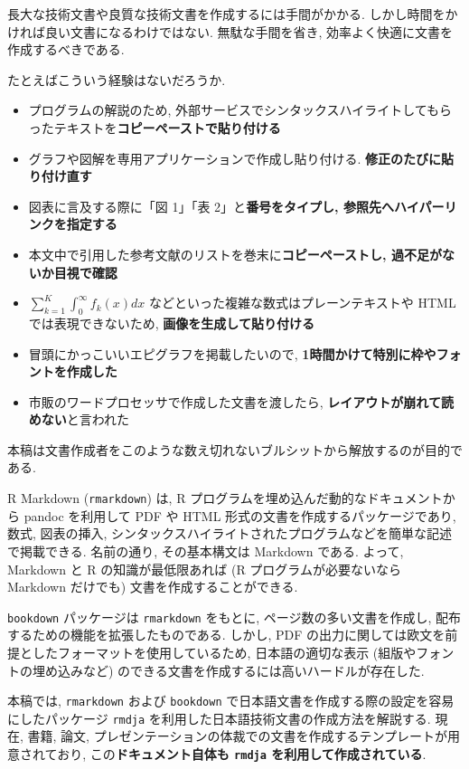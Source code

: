 \documentclass[
  xelatex,ja=standard,jafont=noto]{bxjsbook}
\providecommand{\tightlist}{%
  \setlength{\itemsep}{0pt}\setlength{\parskip}{0pt}}
\theoremstyle{definition}
\theoremstyle{definition}
\theoremstyle{definition}
\theoremstyle{definition}
\theoremstyle{remark}
\begin{document}
長大な技術文書や良質な技術文書を作成するには手間がかかる.
しかし時間をかければ良い文書になるわけではない. 無駄な手間を省き,
効率よく快適に文書を作成するべきである.

たとえばこういう経験はないだろうか.

\begin{itemize}
\tightlist
\item
  プログラムの解説のため,
  外部サービスでシンタックスハイライトしてもらったテキストを\textbf{コピーペーストで貼り付ける}
\item
  グラフや図解を専用アプリケーションで作成し貼り付ける.
  \textbf{修正のたびに貼り付け直す}
\item
  図表に言及する際に「図 1」「表 2」と\textbf{番号をタイプし,
  参照先へハイパーリンクを指定する}
\item
  本文中で引用した参考文献のリストを巻末に\textbf{コピーペーストし,
  過不足がないか目視で確認}
\item
  \(\sum_{k=1}^K\int_0^\infty f_k(x) dx\)
  などといった複雑な数式はプレーンテキストや HTML では表現できないため,
  \textbf{画像を生成して貼り付ける}
\item
  冒頭にかっこいいエピグラフを掲載したいので,
  \textbf{1時間かけて特別に枠やフォントを作成した}
\item
  市販のワードプロセッサで作成した文書を渡したら,
  \textbf{レイアウトが崩れて読めない}と言われた
\end{itemize}

本稿は文書作成者をこのような数え切れないブルシットから解放するのが目的である.

R Markdown (\texttt{rmarkdown}) は, R
プログラムを埋め込んだ動的なドキュメントから pandoc を利用して PDF や
HTML 形式の文書を作成するパッケージであり, 数式, 図表の挿入,
シンタックスハイライトされたプログラムなどを簡単な記述で掲載できる.
名前の通り, その基本構文は Markdown である. よって, Markdown と R
の知識が最低限あれば (R プログラムが必要ないなら Markdown だけでも)
文書を作成することができる.

\texttt{bookdown} パッケージは \texttt{rmarkdown} をもとに,
ページ数の多い文書を作成し, 配布するための機能を拡張したものである.
しかし, PDF
の出力に関しては欧文を前提としたフォーマットを使用しているため,
日本語の適切な表示 (組版やフォントの埋め込みなど)
のできる文書を作成するには高いハードルが存在した.

本稿では, \texttt{rmarkdown} および \texttt{bookdown}
で日本語文書を作成する際の設定を容易にしたパッケージ \texttt{rmdja}
を利用した日本語技術文書の作成方法を解説する. 現在, 書籍, 論文,
プレゼンテーションの体裁での文書を作成するテンプレートが用意されており,
この\textbf{ドキュメント自体も \texttt{rmdja} を利用して作成されている}.
\end{document}
